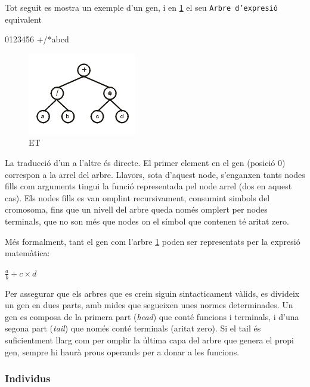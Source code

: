 Tot seguit es mostra un exemple d'un gen, i en \ref{fig:expression tree1} el seu
\texttt{Arbre d'expresió} equivalent

\begin{center}
0123456    
+/*abcd
\end{center}

\begin{figure}[h]
\begin{center}
\includegraphics{intro/et1.png}
\end{center}
\caption{ET}
\label{fig:expression tree1}
\end{figure}

La traducció d'un a l'altre és directe.  El primer element en el gen (posició
0) correspon a la arrel del arbre.  Llavors, sota d'aquest node, s'enganxen
tants nodes fills com arguments tingui la funció representada pel node arrel
(dos en aquest cas). Els nodes fills es van omplint recursivament, consumint
simbols del cromosoma, fins que un nivell del arbre queda només omplert per
nodes terminals, que no son més que nodes on el símbol que contenen té aritat
zero.

Més formalment, tant el gen com l'arbre \ref{fig:expression tree1} poden ser
representats per la expresió matemàtica:

	$\frac{a}{b}+c \times d$

Per assegurar que els arbres que es crein siguin sintacticament vàlids,
es divideix un gen en dues parts, amb mides que segueixen unes normes
determinades.  Un gen es composa de la primera part (\emph{head}) que conté
funcions i terminals, i d'una segona part (\emph{tail}) que només conté
terminals (aritat zero). Si el tail és suficientment llarg com per omplir la
última capa del arbre que genera el propi gen, sempre hi haurà prous operands
per a donar a les funcions.


\subsubsection{Individus} %
\label{issub:individus}

